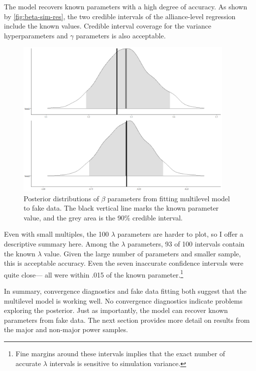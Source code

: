 \documentclass[12pt]{article}
\begin{document}
The model recovers known parameters with a high degree of accuracy. 
As shown by \autoref{fig:beta-sim-res}, the two credible intervals of the alliance-level regression include the known values.
Credible interval coverage for the variance hyperparameters and $\gamma$ parameters is also acceptable. 


\begin{figure}[htbp]
	\centering
		\includegraphics[width=0.95\textwidth]{beta-sim-res.png}
	\caption{Posterior distributions of $\beta$ parameters from fitting multilevel model to fake data. The black vertical line marks the known parameter value, and the grey area is the 90\% credible interval.}
	\label{fig:beta-sim-res}
\end{figure}


 
Even with small multiples, the 100 $\lambda$ parameters are harder to plot, so I offer a descriptive summary here. 
Among the $\lambda$ parameters, 93 of 100 intervals contain the known $\lambda$ value.
Given the large number of parameters and smaller sample, this is acceptable accuracy. 
Even the seven inaccurate confidence intervals were quite close--- all were within .015 of the known parameter.\footnote{Fine margins around these intervals implies that the exact number of accurate $\lambda$ intervals is sensitive to simulation variance.}


In summary, convergence diagnostics and fake data fitting both suggest that the multilevel model is working well. 
No convergence diagnostics indicate problems exploring the posterior. 
Just as importantly, the model can recover known parameters from fake data. 
The next section provides more detail on results from the major and non-major power samples. 
\end{document}
